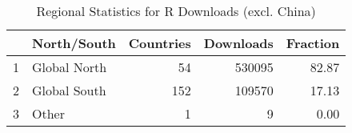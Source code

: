 \begin{table}[ht]
\centering
\begin{tabular}{rlrrr}
  \hline
 & North/South & Countries & Downloads & Fraction \\ 
  \hline
1 & Global North &  54 & 530095 & 82.87 \\ 
  2 & Global South & 152 & 109570 & 17.13 \\ 
  3 & Other &   1 &   9 & 0.00 \\ 
   \hline
\end{tabular}
\caption{Regional Statistics for R Downloads (excl. China)} 
\label{tab:r_downloads_global_stats_select_nochina}
\end{table}
